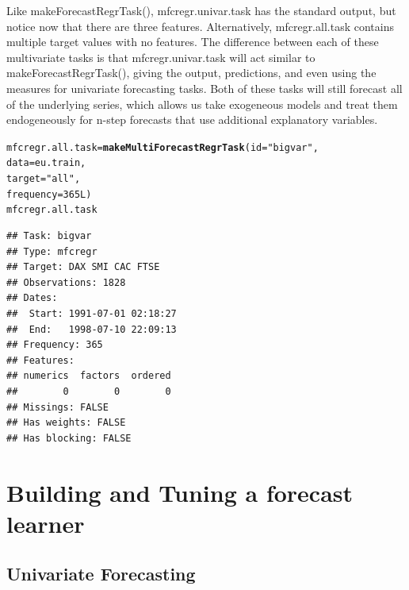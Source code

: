 \documentclass{article}\usepackage[]{graphicx}\usepackage[]{color}
\makeatletter
\newcommand{\hlnum}[1]{\textcolor[rgb]{0.686,0.059,0.569}{#1}}%
\newcommand{\hlstr}[1]{\textcolor[rgb]{0.192,0.494,0.8}{#1}}%
\newcommand{\hlstd}[1]{\textcolor[rgb]{0.345,0.345,0.345}{#1}}%
\newcommand{\hlkwb}[1]{\textcolor[rgb]{0.69,0.353,0.396}{#1}}%
\newcommand{\hlkwc}[1]{\textcolor[rgb]{0.333,0.667,0.333}{#1}}%
\newcommand{\hlkwd}[1]{\textcolor[rgb]{0.737,0.353,0.396}{\textbf{#1}}}%
\newenvironment{kframe}{%
 \def\at@end@of@kframe{}%
 \ifinner\ifhmode%
  \def\at@end@of@kframe{\end{minipage}}%
  \begin{minipage}{\columnwidth}%
 \fi\fi%
 \def\FrameCommand##1{\hskip\@totalleftmargin \hskip-\fboxsep
 \colorbox{shadecolor}{##1}\hskip-\fboxsep
     \hskip-\linewidth \hskip-\@totalleftmargin \hskip\columnwidth}%
 \MakeFramed {\advance\hsize-\width
   \@totalleftmargin\z@ \linewidth\hsize
   \@setminipage}}%
 {\par\unskip\endMakeFramed%
 \at@end@of@kframe}
\newenvironment{knitrout}{}{} %
\theoremstyle{definition}
\newcommand\code{\@codex}
\def\@codex#1{{\normalfont\ttfamily\hyphenchar\font=-1 #1}}
\makeatother
\begin{document}
Like \code{makeForecastRegrTask()}, \code{mfcregr.univar.task} has the standard output, but notice now that there are three features. Alternatively, \code{mfcregr.all.task} contains multiple target values with no features. The difference between each of these multivariate tasks is that \code{mfcregr.univar.task} will act similar to \code{makeForecastRegrTask()}, giving the output, predictions, and even using the measures for univariate forecasting tasks. Both of these tasks will still forecast all of the underlying series, which allows us take exogeneous models and treat them endogeneously for n-step forecasts that use additional explanatory variables.

\begin{knitrout}
\color{fgcolor}\begin{kframe}
\begin{alltt}
\hlstd{mfcregr.all.task} \hlkwb{=} \hlkwd{makeMultiForecastRegrTask}\hlstd{(}\hlkwc{id} \hlstd{=} \hlstr{"bigvar"}\hlstd{,}
                                             \hlkwc{data} \hlstd{= eu.train,}
                                             \hlkwc{target} \hlstd{=} \hlstr{"all"}\hlstd{,}
                                             \hlkwc{frequency} \hlstd{=} \hlnum{365L}\hlstd{)}
\hlstd{mfcregr.all.task}
\end{alltt}
\begin{verbatim}
## Task: bigvar
## Type: mfcregr
## Target: DAX SMI CAC FTSE
## Observations: 1828
## Dates:
##  Start: 1991-07-01 02:18:27 
##  End:   1998-07-10 22:09:13
## Frequency: 365
## Features:
## numerics  factors  ordered 
##        0        0        0 
## Missings: FALSE
## Has weights: FALSE
## Has blocking: FALSE
\end{verbatim}
\end{kframe}
\end{knitrout}

\section{Building and Tuning a forecast learner}

\subsection{Univariate Forecasting}
\end{document}
